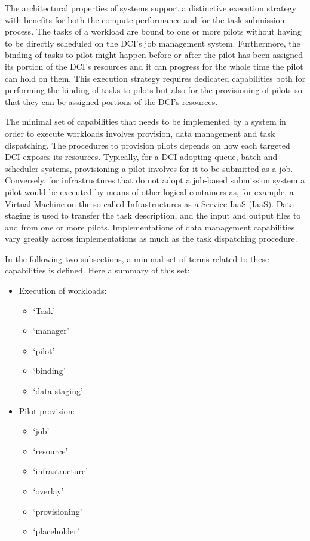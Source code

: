 \documentclass{sig-alternate}
\begin{document}
The architectural properties of \pilotjob systems support a
distinctive execution strategy with benefits for both the compute
performance and for the task submission process. The tasks of a
workload are bound to one or more pilots without having to be directly
scheduled on the DCI's job management system. Furthermore, the binding
of tasks to pilot might happen before or after the pilot has been
assigned its portion of the DCI's resources and it can progress for
the whole time the pilot can hold on them. This execution strategy
requires dedicated capabilities both for performing the binding of
tasks to pilots but also for the provisioning of pilots so that they
can be assigned portions of the DCI's resources.

The minimal set of capabilities that needs to be implemented by a \pilotjob
system in order to execute workloads involves \pilot provision, data management
and task dispatching. The procedures to provision pilots depends on how each
targeted DCI exposes its resources. Typically, for a DCI adopting queue, batch
and scheduler systems, provisioning a pilot involves for it to be submitted as
a job. Conversely, for infrastructures that do not adopt a job-based submission
system a pilot would be executed by means of other logical containers as, for
example, a Virtual Machine on the so called Infrastructures as a Service IaaS
(IaaS). Data staging is used to transfer the task description, and the input 
and output files to and from one or more pilots. Implementations of data 
management capabilities vary greatly across \pilotjob implementations as much 
as the task dispatching procedure.

In the following two subsections, a minimal set of terms related to these 
capabilities is defined. Here a summary of this set:

\begin{itemize}
  \item Execution of workloads:
  \begin{itemize}
    \item `Task'
    \item `manager'
    \item `pilot'
    \item `binding'
    \item `data staging'
  \end{itemize}
  \item Pilot provision:
  \begin{itemize}
    \item `job'
    \item `resource'
    \item `infrastructure'
    \item `overlay'
    \item `provisioning'
    \item `placeholder'
  \end{itemize}
\end{itemize}
\end{document}
